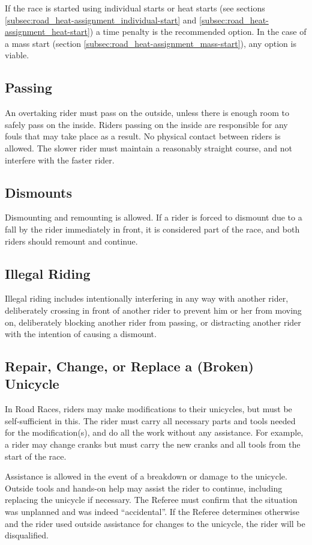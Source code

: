 If the race is started using individual starts or heat starts (see sections \ref{subsec:road_heat-assignment_individual-start} and \ref{subsec:road_heat-assignment_heat-start}) a time penalty is the recommended option.
In the case of a mass start (section \ref{subsec:road_heat-assignment_mass-start}), any option is viable.

\subsection{Passing}

An overtaking rider must pass on the outside, unless there is enough room to safely pass on the inside.
Riders passing on the inside are responsible for any fouls that may take place as a result.
No physical contact between riders is allowed.
The slower rider must maintain a reasonably straight course, and not interfere with the faster rider.

\subsection{Dismounts}

Dismounting and remounting is allowed.
If a rider is forced to dismount due to a fall by the rider immediately in front, it is considered part of the race, and both riders should remount and continue.

\subsection{Illegal Riding}

Illegal riding includes intentionally interfering in any way with another rider, deliberately crossing in front of another rider to prevent him or her from moving on, deliberately blocking another rider from passing, or distracting another rider with the intention of causing a dismount.

\subsection{Repair, Change, or Replace a (Broken) Unicycle}
In Road Races, riders may make modifications to their unicycles, but must be self-sufficient in this.
The rider must carry all necessary parts and tools needed for the modification(s), and do all the work without any assistance.
For example, a rider may change cranks but must carry the new cranks and all tools from the start of the race.

Assistance is allowed in the event of a breakdown or damage to the unicycle.
Outside tools and hands-on help may assist the rider to continue, including replacing the unicycle if necessary.
The Referee must confirm that the situation was unplanned and was indeed ``accidental''.
If the Referee determines otherwise and the rider used outside assistance for changes to the unicycle, the rider will be disqualified.

